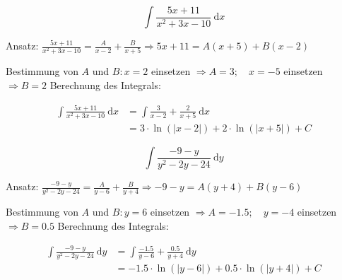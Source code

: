 \begin{example}

$$\int \frac{5 x+11}{x^{2}+3 x-10} \mathrm{~d} x$$

Ansatz: $\frac{5 x+11}{x^{2}+3 x-10}=\frac{A}{x-2}+\frac{B}{x+5} \Rightarrow 5 x+11=A(x+5)+B(x-2)$

Bestimmung von $A$ und $B: x=2$ einsetzen $\Rightarrow A=3 ; \quad x=-5$ einsetzen $\Rightarrow B=2$ Berechnung des Integrals:

$$
\begin{aligned}
\int \frac{5 x+11}{x^{2}+3 x-10} \mathrm{~d} x & =\int \frac{3}{x-2}+\frac{2}{x+5} \mathrm{~d} x \\
& =3 \cdot \ln (|x-2|)+2 \cdot \ln (|x+5|)+C
\end{aligned}
$$

\end{example}

\begin{example}

    $$\int \frac{-9-y}{y^{2}-2 y-24} \mathrm{~d} y$$

    Ansatz: $\frac{-9-y}{y^{2}-2 y-24}=\frac{A}{y-6}+\frac{B}{y+4} \Rightarrow-9-y=A(y+4)+B(y-6)$

Bestimmung von $A$ und $B: y=6$ einsetzen $\Rightarrow A=-1.5 ; \quad y=-4$ einsetzen $\Rightarrow B=0.5$ Berechnung des Integrals:

$$
\begin{aligned}
\int \frac{-9-y}{y^{2}-2 y-24} \mathrm{~d} y & =\int \frac{-1.5}{y-6}+\frac{0.5}{y+4} \mathrm{~d} y \\
& =-1.5 \cdot \ln (|y-6|)+0.5 \cdot \ln (|y+4|)+C
\end{aligned}
$$
\end{example}


\raggedcolumns
\columnbreak